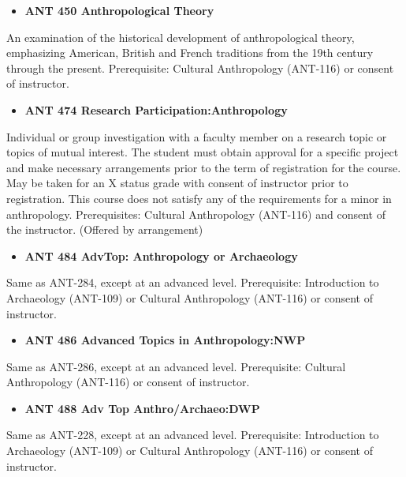 \documentclass[
  letterpaper,
]{scrbook}
\providecommand{\tightlist}{%
  \setlength{\itemsep}{0pt}\setlength{\parskip}{0pt}}
\begin{document}
\begin{itemize}
\tightlist
\item
  \textbf{ANT 450 Anthropological Theory}
\end{itemize}

An examination of the historical development of anthropological theory,
emphasizing American, British and French traditions from the 19th
century through the present. Prerequisite: Cultural Anthropology
(ANT-116) or consent of instructor.

\begin{itemize}
\tightlist
\item
  \textbf{ANT 474 Research Participation:Anthropology}
\end{itemize}

Individual or group investigation with a faculty member on a research
topic or topics of mutual interest. The student must obtain approval for
a specific project and make necessary arrangements prior to the term of
registration for the course. May be taken for an X status grade with
consent of instructor prior to registration. This course does not
satisfy any of the requirements for a minor in anthropology.
Prerequisites: Cultural Anthropology (ANT-116) and consent of the
instructor. (Offered by arrangement)

\begin{itemize}
\tightlist
\item
  \textbf{ANT 484 AdvTop: Anthropology or Archaeology}
\end{itemize}

Same as ANT-284, except at an advanced level. Prerequisite: Introduction
to Archaeology (ANT-109) or Cultural Anthropology (ANT-116) or consent
of instructor.

\begin{itemize}
\tightlist
\item
  \textbf{ANT 486 Advanced Topics in Anthropology:NWP}
\end{itemize}

Same as ANT-286, except at an advanced level. Prerequisite: Cultural
Anthropology (ANT-116) or consent of instructor.

\begin{itemize}
\tightlist
\item
  \textbf{ANT 488 Adv Top Anthro/Archaeo:DWP}
\end{itemize}

Same as ANT-228, except at an advanced level. Prerequisite: Introduction
to Archaeology (ANT-109) or Cultural Anthropology (ANT-116) or consent
of instructor.
\end{document}
